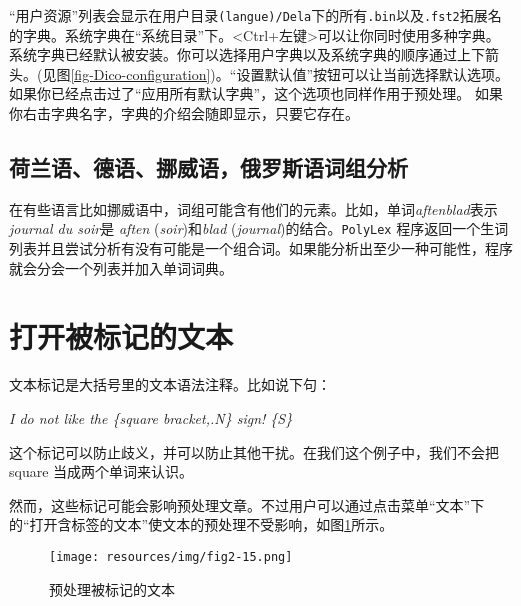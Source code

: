 \bigskip
\noindent “用户资源”列表会显示在用户目录\verb+(langue)/Dela+下的所有\verb+.bin+以及\verb+.fst2+拓展名的字典。系统字典在“系统目录”下。<Ctrl+左键>可以让你同时使用多种字典。系统字典已经默认被安装。你可以选择用户字典以及系统字典的顺序通过上下箭头。(见图\ref{fig-Dico-configuration})。“设置默认值”按钮可以让当前选择默认选项。如果你已经点击过了“应用所有默认字典”，这个选项也同样作用于预处理。 
如果你右击字典名字，字典的介绍会随即显示，只要它存在。

\subsection{荷兰语、德语、挪威语，俄罗斯语词组分析}

\label{section-Norwegian-compound-words}
在有些语言比如挪威语中，词组可能含有他们的元素。比如，单词\textit{aftenblad}表示 \textit{journal du soir}是 \textit{aften} (\textit{soir})和\textit{blad}
(\textit{journal})的结合。\verb+PolyLex+ 程序返回一个生词列表并且尝试分析有没有可能是一个组合词。如果能分析出至少一种可能性，程序就会分会一个列表并加入单词词典。

\section{打开被标记的文本}
文本标记是大括号里的文本语法注释。比如说下句：

\bigskip
\textit{I do not like the \{square bracket,.N\} sign! \{S\}}

\bigskip
\noindent 这个标记可以防止歧义，并可以防止其他干扰。在我们这个例子中，我们不会把square 当成两个单词来认识。


\bigskip
\noindent 然而，这些标记可能会影响预处理文章。不过用户可以通过点击菜单“文本”下的“打开含标签的文本”使文本的预处理不受影响，如图\ref{preprocess-tagged-text}所示。

\bigskip
\begin{figure}[!h]
\begin{center}
\texttt{[image: resources/img/fig2-15.png]}
\caption{预处理被标记的文本\label{preprocess-tagged-text}}
\end{center}
\end{figure}

